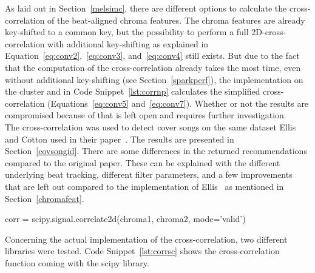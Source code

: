 As laid out in Section~\ref{melsimc}, there are different options to calculate the cross-correlation of the beat-aligned chroma features. The chroma features are already key-shifted to a common key, but the possibility to perform a full 2D-cross-correlation with additional key-shifting as explained in Equation~\eqref{eq:conv2},~\eqref{eq:conv3}, and~\eqref{eq:conv4} still exists. But due to the fact that the computation of the cross-correlation already takes the most time, even without additional key-shifting (see Section~\ref{sparkperf}), the implementation on the cluster and in Code Snippet~\ref{lst:corrnp} calculates the simplified cross-correlation (Equations~\eqref{eq:conv5} and~\eqref{eq:conv7}). Whether or not the results are compromised because of that is left open and requires further investigation.\\
\noindent The cross-correlation was used to detect cover songs on the same dataset Ellis and Cotton used in their paper~\cite{cover802}. The results are presented in Section~\ref{covsongid}. There are some differences in the returned recommendations compared to the original paper. These can be explained with the different underlying beat tracking, different filter parameters, and a few improvements that are left out compared to the implementation of Ellis~\cite{cover802} as mentioned in Section~\ref{chromafeat}.\\

\begin{pythonCode}[frame=single,label={lst:corrsc},caption={Cross-correlation scipy},captionpos=b]
corr = scipy.signal.correlate2d(chroma1, chroma2, mode='valid')
\end{pythonCode}

\noindent Concerning the actual implementation of the cross-correlation, two different libraries were tested. Code Snippet~\ref{lst:corrsc} shows the cross-correlation function coming with the scipy library.

